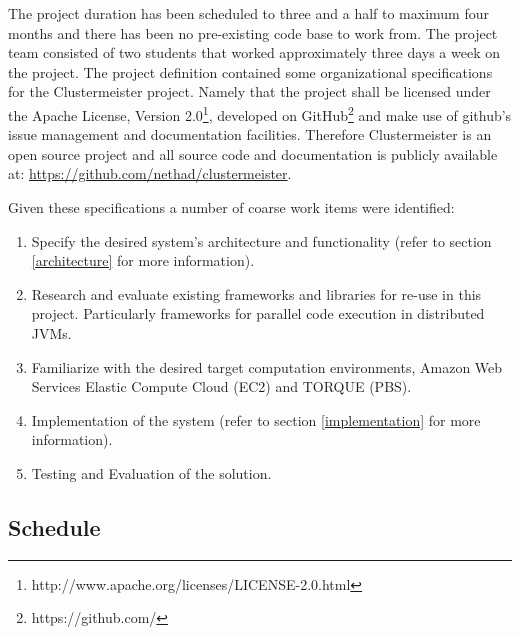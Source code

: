 \documentclass[12pt]{article}
\begin{document}
The project duration has been scheduled to three and a half to maximum four months and there has been no pre-existing code base to work from. The project team consisted of two students that worked approximately three days a week on the project. The project definition contained some organizational specifications for the Clustermeister project. Namely that the project shall be licensed under the Apache License, Version 2.0\footnote{http://www.apache.org/licenses/LICENSE-2.0.html}, developed on GitHub\footnote{https://github.com/} and make use of github's issue management and documentation facilities. Therefore Clustermeister is an open source project and all source code and documentation is publicly available at: \url{https://github.com/nethad/clustermeister}.

Given these specifications a number of coarse work items were identified:
\begin{enumerate}
\item \label{wi:spec}Specify the desired system's architecture and functionality (refer to section \ref{architecture} for more information).
\item \label{wi:res}Research and evaluate existing frameworks and libraries for re-use in this project. Particularly frameworks for parallel code execution in distributed JVMs.
\item \label{wi:fam}Familiarize with the desired target computation environments, Amazon Web Services Elastic Compute Cloud (EC2) and TORQUE (PBS).
\item \label{wi:impl}Implementation of the system (refer to section \ref{implementation} for more information).
\item \label{wi:eval}Testing and Evaluation of the solution.
\end{enumerate}

\subsection{Schedule}
\end{document}
